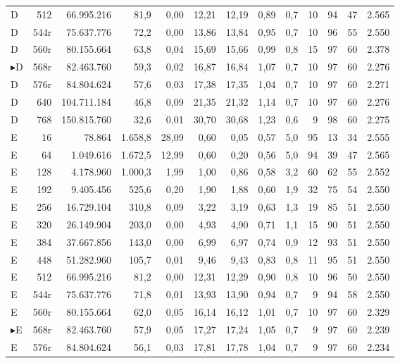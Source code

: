 {\begin{longtable}{l r r r r r r r r r r r r}
D & 512 & 66.995.216 & 81,9 & 0,00 & 12,21 & 12,19 & 0,89 & 0,7 & 10 & 94 & 47 & 2.565 \\
D & 544r & 75.637.776 & 72,2 & 0,00 & 13,86 & 13,84 & 0,95 & 0,7 & 10 & 96 & 55 & 2.550 \\
D & 560r & 80.155.664 & 63,8 & 0,04 & 15,69 & 15,66 & 0,99 & 0,8 & 15 & 97 & 60 & 2.378 \\
$\blacktriangleright$D & 568r & 82.463.760 & 59,3 & 0,02 & 16,87 & 16,84 & 1,07 & 0,7 & 10 & 97 & 60 & 2.276 \\
D & 576r & 84.804.624 & 57,6 & 0,03 & 17,38 & 17,35 & 1,04 & 0,7 & 10 & 97 & 60 & 2.271 \\
D & 640 & 104.711.184 & 46,8 & 0,09 & 21,35 & 21,32 & 1,14 & 0,7 & 10 & 97 & 60 & 2.276 \\
D & 768 & 150.815.760 & 32,6 & 0,01 & 30,70 & 30,68 & 1,23 & 0,6 & 9 & 98 & 60 & 2.275 \\
\midrule
E & 16 & 78.864 & 1.658,8 & 28,09 & 0,60 & 0,05 & 0,57 & 5,0 & 95 & 13 & 34 & 2.555 \\
E & 64 & 1.049.616 & 1.672,5 & 12,99 & 0,60 & 0,20 & 0,56 & 5,0 & 94 & 39 & 47 & 2.565 \\
E & 128 & 4.178.960 & 1.000,3 & 1,99 & 1,00 & 0,86 & 0,58 & 3,2 & 60 & 62 & 55 & 2.552 \\
E & 192 & 9.405.456 & 525,6 & 0,20 & 1,90 & 1,88 & 0,60 & 1,9 & 32 & 75 & 54 & 2.550 \\
E & 256 & 16.729.104 & 310,8 & 0,09 & 3,22 & 3,19 & 0,63 & 1,3 & 19 & 85 & 51 & 2.550 \\
E & 320 & 26.149.904 & 203,0 & 0,00 & 4,93 & 4,90 & 0,71 & 1,1 & 15 & 90 & 51 & 2.550 \\
E & 384 & 37.667.856 & 143,0 & 0,00 & 6,99 & 6,97 & 0,74 & 0,9 & 12 & 93 & 51 & 2.550 \\
E & 448 & 51.282.960 & 105,7 & 0,01 & 9,46 & 9,43 & 0,83 & 0,8 & 11 & 95 & 51 & 2.550 \\
E & 512 & 66.995.216 & 81,2 & 0,00 & 12,31 & 12,29 & 0,90 & 0,8 & 10 & 96 & 50 & 2.550 \\
E & 544r & 75.637.776 & 71,8 & 0,01 & 13,93 & 13,90 & 0,94 & 0,7 & 9 & 94 & 58 & 2.550 \\
E & 560r & 80.155.664 & 62,0 & 0,05 & 16,14 & 16,12 & 1,01 & 0,7 & 10 & 97 & 60 & 2.329 \\
$\blacktriangleright$E & 568r & 82.463.760 & 57,9 & 0,05 & 17,27 & 17,24 & 1,05 & 0,7 & 9 & 97 & 60 & 2.239 \\
E & 576r & 84.804.624 & 56,1 & 0,03 & 17,81 & 17,78 & 1,04 & 0,7 & 9 & 97 & 60 & 2.234 \\

\end{longtable}}
